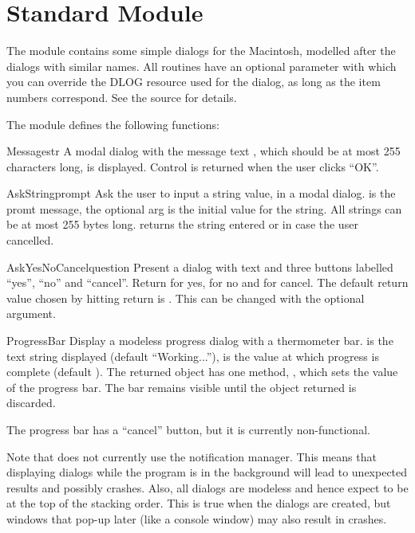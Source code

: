\section{Standard Module }



The  module contains some simple dialogs for
the Macintosh, modelled after the  dialogs with similar
names. All routines have an optional parameter  with which you
can override the DLOG resource used for the dialog, as long as the
item numbers correspond. See the source for details.
 
The  module defines the following functions:


\begin{funcdesc}{Message}{str}
A modal dialog with the message text , which should be at
most 255 characters long, is displayed. Control is returned when the
user clicks ``OK''.
\end{funcdesc}

\begin{funcdesc}{AskString}{prompt}
Ask the user to input a string value, in a modal dialog. 
is the promt message, the optional  arg is the initial
value for the string. All strings can be at most 255 bytes
long.  returns the string entered or 
in case the user cancelled.
\end{funcdesc}

\begin{funcdesc}{AskYesNoCancel}{question}
Present a dialog with text  and three buttons labelled
``yes'', ``no'' and ``cancel''. Return  for yes,  for
no and  for cancel. The default return value chosen by
hitting return is . This can be changed with the optional
 argument.
\end{funcdesc}

\begin{funcdesc}{ProgressBar}{}
Display a modeless progress dialog with a thermometer bar. 
is the text string displayed (default ``Working...''),  is
the value at which progress is complete (default ). The
returned object has one method, , which sets
the value of the progress bar. The bar remains visible until the
object returned is discarded.

The progress bar has a ``cancel'' button, but it is currently
non-functional.
\end{funcdesc}

Note that  does not currently use the notification
manager. This means that displaying dialogs while the program is in
the background will lead to unexpected results and possibly
crashes. Also, all dialogs are modeless and hence expect to be at the
top of the stacking order. This is true when the dialogs are created,
but windows that pop-up later (like a console window) may also result
in crashes.
